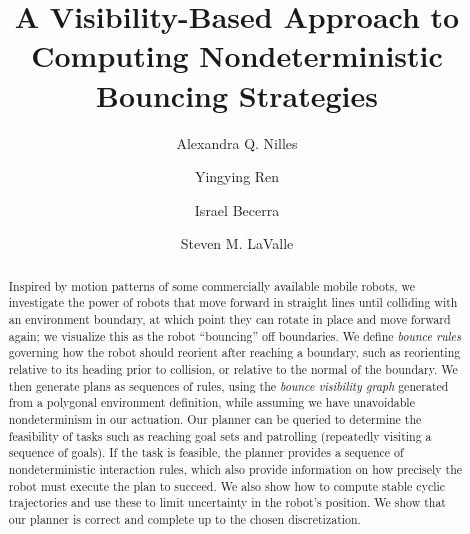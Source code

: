 \documentclass[]{article}
\newcommand{\todo}[1]{ {\color{red} #1} }
\begin{document}


\title{A Visibility-Based Approach to Computing Nondeterministic Bouncing
Strategies}

\author[1]{Alexandra Q. Nilles}
\author[2]{Yingying Ren}
\author[3]{Israel Becerra}
\author[4]{Steven M. LaValle}


\maketitle

\begin{abstract}
Inspired by motion patterns of some commercially available mobile robots, we
investigate the power of robots that move forward in straight lines until
colliding with an environment boundary, at which point they can rotate in place
and move forward again; we visualize this as the robot ``bouncing'' off
boundaries. We define {\em bounce rules} governing how the robot should reorient
after reaching a boundary, such as reorienting relative to its heading prior to 
collision, or relative to the normal of the boundary. We then generate plans as sequences of rules, using the
{\em bounce visibility graph} generated from a polygonal environment definition,
while assuming we have unavoidable nondeterminism in our actuation. Our planner
can be queried to determine the feasibility of tasks such as reaching goal sets
and patrolling (repeatedly visiting a sequence of goals). If the task is
feasible, the planner provides a sequence of nondeterministic interaction rules,
which also provide information on how precisely the robot must execute the plan
to succeed. We also show how to compute stable cyclic trajectories and use these
to limit uncertainty in the robot's position. We show that our planner is
correct and \todo{complete up to the chosen discretization.}
\end{abstract}
\end{document}
